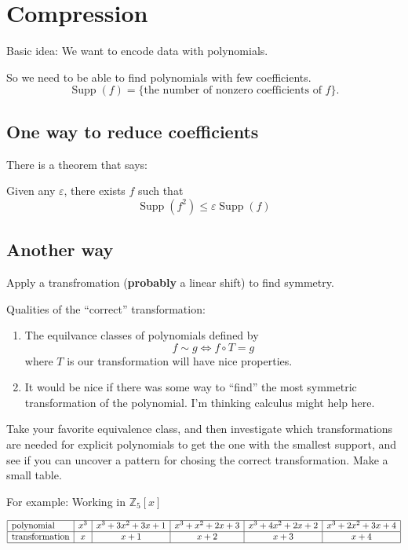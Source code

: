 \documentclass{amsart}
\newcommand{\Z}{\mathbb{Z}}
\newcommand{\supp}{\mathop{\mathrm{Supp}}\nolimits}
\newcommand{\ep}{\varepsilon}
\begin{document}
\section*{Compression}


Basic idea: We want to encode data with polynomials.

So we need to be able to find polynomials with few coefficients.
\[
\supp(f) = \{\text{the number of nonzero coefficients of $f$}\}.
\]

\subsection*{One way to reduce coefficients}

There is a theorem that says:

Given any $\ep$, there exists $f$ such that
\[
\supp(f^2)\le \ep \supp(f)
\]

\subsection*{Another way}

Apply a transfromation (\textbf{probably} a linear shift) to find symmetry.

Qualities of the ``correct'' transformation:
\begin{enumerate}
  \item The equilvance classes of polynomials defined by
    \[
    f \sim g \Leftrightarrow f\circ T = g
    \]
    where $T$ is our transformation will have nice properties.
  \item It would be nice if there was some way to ``find'' the most
    symmetric transformation of the polynomial. I'm thinking calculus might help here.
\end{enumerate}

Take your favorite equivalence class, and then investigate which
transformations are needed for explicit polynomials to get the one
with the smallest support, and see if you can uncover a pattern for
chosing the correct transformation. Make a small table.


For example: Working in $\Z_{5}[x]$

\[
\begin{array}{|l|c|c|c|c|c|}\hline
  \text{polynomial} &
  x^3 &
  x^3+3 x^2+3 x+1 &
  x^3+x^2+2 x+3   &
  x^3+4 x^2+2 x+2 &
  x^3+2 x^2+3 x+4 \\ \hline
 \text{transformation} &  x   & x+1 & x+2 & x+3 & x+4 \\ \hline
\end{array}
\]
\end{document}

